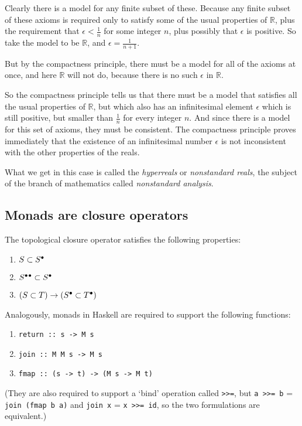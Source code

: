 \documentclass{article}
\def\R{{\mathbb R}}
\def\clos#1{\smash{#1}^\bullet\vphantom{#1}}
\def\closclos#1{\clos{\clos{#1}}}
\def\bind{{\tt >>=}}            %
\begin{document}
Clearly there is a model for any finite subset of these.
Because any finite subset of these axioms is required only to satisfy
some of the usual properties of $\R$, plus the requirement that
$\epsilon < \frac1n$ for some integer $n$, plus possibly that
$\epsilon$ is positive.  So take the model to be $\R$, and $\epsilon =
\frac1{n+1}$.

But by the compactness principle, there must be a model for all of the
axioms at once, and here $\R$ will not do, because there is no such
$\epsilon$ in $\R$.  

So the compactness principle tells us that there must be a model that
satisfies all the usual properties of $\R$, but which also has an
infinitesimal element $\epsilon$ which is still positive, but smaller
than $\frac1n$ for every integer $n$.  And since there is a model for
this set of axioms, they must be consistent.  The compactness principle
proves immediately that the existence of an infinitesimal number
$\epsilon$ is not inconsistent with the other properties of the reals.

What we get in this case is called the {\em hyperreals\/} or {\em
  nonstandard reals\/}, the subject of the branch of mathematics
called {\em nonstandard analysis\/}.  

\subsection*{Monads are closure operators}

The topological closure operator satisfies the following properties:

\begin{enumerate}
  \item $S\subset\clos S$
  \item $\closclos S\subset \clos S$
  \item $(S\subset T) \rightarrow (\clos S\subset\clos T)$
\end{enumerate}

Analogously, monads in Haskell are required to support the following
functions:

\begin{enumerate}
  \item {\tt return :: s -> M s }
  \item {\tt join :: M M s -> M s }
  \item {\tt fmap :: (s -> t) -> (M s -> M t)}
\end{enumerate}

(They are also required to support a `bind' operation called
\bind, but {\tt a~\bind~b} = {\tt join (fmap b a)} and {\tt join~x} =
{\tt  x \bind\ id}, so the two formulations
are equivalent.)  
\end{document}
